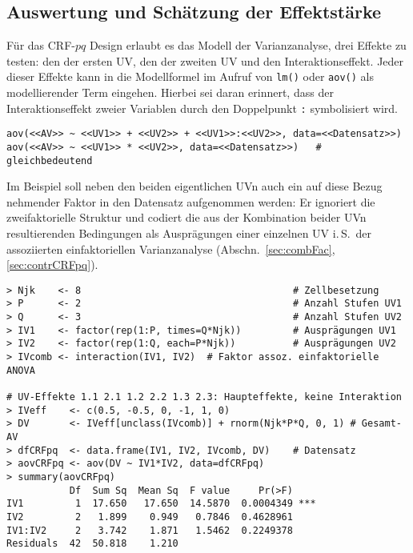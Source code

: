 \subsection{Auswertung und Schätzung der Effektstärke}
\label{sec:CRFpqAov}

Für das CRF-$pq$ Design erlaubt es das Modell der Varianzanalyse, drei Effekte zu testen: den der ersten UV, den der zweiten UV und den Interaktionseffekt. Jeder dieser Effekte kann in die Modellformel im Aufruf von \lstinline!lm()! oder \lstinline!aov()! als modellierender Term eingehen. Hierbei sei daran erinnert, dass der Interaktionseffekt zweier Variablen durch den Doppelpunkt \lstinline!:! symbolisiert wird.
\begin{lstlisting}
aov(<<AV>> ~ <<UV1>> + <<UV2>> + <<UV1>>:<<UV2>>, data=<<Datensatz>>)
aov(<<AV>> ~ <<UV1>> * <<UV2>>, data=<<Datensatz>>)   # gleichbedeutend
\end{lstlisting}

Im Beispiel soll neben den beiden eigentlichen UVn auch ein auf diese Bezug nehmender Faktor in den Datensatz aufgenommen werden: Er ignoriert die zweifaktorielle Struktur und codiert die aus der Kombination beider UVn resultierenden Bedingungen als Ausprägungen einer einzelnen UV i.\,S.\ der assoziierten einfaktoriellen Varianzanalyse (Abschn.\ \ref{sec:combFac}, \ref{sec:contrCRFpq}).
\begin{lstlisting}
> Njk    <- 8                                     # Zellbesetzung
> P      <- 2                                     # Anzahl Stufen UV1
> Q      <- 3                                     # Anzahl Stufen UV2
> IV1    <- factor(rep(1:P, times=Q*Njk))         # Ausprägungen UV1
> IV2    <- factor(rep(1:Q, each=P*Njk))          # Ausprägungen UV2
> IVcomb <- interaction(IV1, IV2)  # Faktor assoz. einfaktorielle ANOVA

# UV-Effekte 1.1 2.1 1.2 2.2 1.3 2.3: Haupteffekte, keine Interaktion
> IVeff    <- c(0.5, -0.5, 0, -1, 1, 0)
> DV       <- IVeff[unclass(IVcomb)] + rnorm(Njk*P*Q, 0, 1) # Gesamt-AV
> dfCRFpq  <- data.frame(IV1, IV2, IVcomb, DV)    # Datensatz
> aovCRFpq <- aov(DV ~ IV1*IV2, data=dfCRFpq)
> summary(aovCRFpq)
           Df  Sum Sq  Mean Sq  F value     Pr(>F)
IV1         1  17.650   17.650  14.5870  0.0004349 ***
IV2         2   1.899    0.949   0.7846  0.4628961
IV1:IV2     2   3.742    1.871   1.5462  0.2249378
Residuals  42  50.818    1.210
\end{lstlisting}

